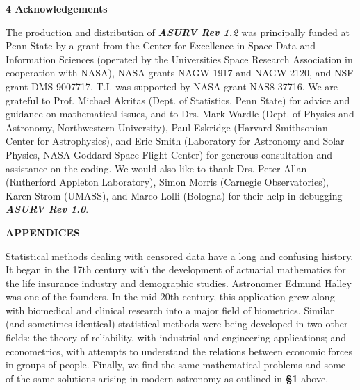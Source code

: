 \newpage

\centerline{\Large\bf 4  Acknowledgements}
 
     The production and distribution of {\sl\bf ASURV Rev 1.2} was 
principally funded at Penn State by 
a grant from the Center for Excellence in Space Data and Information
Sciences (operated by the Universities Space Research Association in
cooperation with NASA), NASA grants NAGW-1917 and NAGW-2120, and
NSF grant DMS-9007717. T.I. was supported by NASA grant NAS8-37716.
We are grateful to Prof. Michael Akritas (Dept. of Statistics, Penn 
State) for advice and guidance on mathematical issues, and
to Drs. Mark Wardle (Dept. of Physics and Astronomy, Northwestern
University), Paul Eskridge (Harvard-Smithsonian Center for Astrophysics),
and Eric Smith (Laboratory for Astronomy and Solar Physics, NASA-Goddard
Space Flight Center) for generous consultation and assistance on the coding.
We would also like to thank Drs. Peter Allan (Rutherford Appleton Laboratory),
Simon Morris (Carnegie Observatories), Karen Strom (UMASS), and Marco
Lolli (Bologna) for their help in debugging {\sl\bf ASURV Rev 1.0}.

\newpage

\bigskip
\centerline{\Large\bf APPENDICES}

\bigskip
\bigskip
{}
  
     Statistical methods dealing with censored data have a long and
confusing history.  It began in the 17th century with the development of
actuarial mathematics for the life insurance industry and demographic 
studies.  Astronomer Edmund Halley was one of the founders. In the
mid-20th century, this application grew along with biomedical and clinical
research into a major field of biometrics. Similar (and sometimes 
identical) statistical methods were  being developed in two other fields:
the theory of reliability, with industrial and engineering applications; 
and econometrics, with attempts to understand the relations between
economic forces in groups of people. Finally, we find the same mathematical
problems and some of the same solutions arising in modern astronomy as
outlined in {\bf \S 1} above.
 
